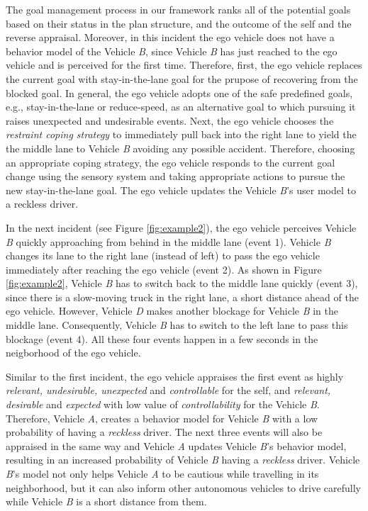 \documentclass[journal, 11pt]{IEEEtran}
\begin{document}
The goal management process in our framework ranks all of the potential goals
based on their status in the plan structure, and the outcome of the self and the
reverse appraisal. Moreover, in this incident the ego vehicle does not have a
behavior model of the Vehicle \textit{B}, since Vehicle \textit{B} has just
reached to the ego vehicle and is perceived for the first time. Therefore,
first, the ego vehicle replaces the current goal with stay-in-the-lane goal for
the prupose of recovering from the blocked goal. In general, the ego vehicle
adopts one of the safe predefined goals, e.g., stay-in-the-lane or reduce-speed,
as an alternative goal to which pursuing it raises unexpected and undesirable
events. Next, the ego vehicle chooses the \textit{restraint coping strategy} to
immediately pull back into the right lane to yield the the middle lane to
Vehicle \textit{B} avoiding any possible accident. Therefore, choosing an
appropriate coping strategy, the ego vehicle responds to the current goal change
using the sensory system and taking appropriate actions to pursue the new
stay-in-the-lane goal. The ego vehicle updates the Vehicle \textit{B}'s user
model to a reckless driver.

In the next incident (see Figure \ref{fig:example2}), the ego vehicle perceives
Vehicle \textit{B} quickly approaching from behind in the middle lane (event 1).
Vehicle \textit{B} changes its lane to the right lane (instead of left) to pass
the ego vehicle immediately after reaching the ego vehicle (event 2). As
shown in Figure \ref{fig:example2}, Vehicle \textit{B} has to switch back to the
middle lane quickly (event 3), since there is a slow-moving truck in the right
lane, a short distance ahead of the ego vehicle. However, Vehicle \textit{D}
makes another blockage for Vehicle \textit{B} in the middle lane. Consequently,
Vehicle \textit{B} has to switch to the left lane to pass this blockage (event
4). All these four events happen in a few seconds in the neigborhood of the ego
vehicle.

Similar to the first incident, the ego vehicle appraises the first event as
highly \textit{relevant, undesirable, unexpected} and \textit{controllable} for
the self, and \textit{relevant, desirable} and \textit{expected} with low value
of \textit{controllability} for the Vehicle \textit{B}. Therefore, Vehicle
\textit{A}, creates a behavior model for Vehicle \textit{B} with a low
probability of having a \textit{reckless} driver. The next three events will
also be appraised in the same way and Vehicle \textit{A} updates Vehicle
\textit{B}'s behavior model, resulting in an increased probability of Vehicle
\textit{B} having a \textit{reckless} driver. Vehicle \textit{B}'s model not
only helps Vehicle \textit{A} to be cautious while travelling in its
neighborhood, but it can also inform other autonomous vehicles to drive
carefully while Vehicle \textit{B} is a short distance from them.\\
\end{document}
